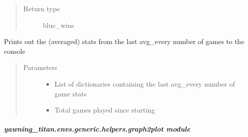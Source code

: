 \documentclass[letterpaper,10pt,english]{sphinxmanual}
\begin{document}
\begin{fulllineitems}
\begin{fulllineitems}
\begin{quote}
\begin{description}
\item[{Return type}] \leavevmode
\sphinxAtStartPar
blue\_wins

\end{description}\end{quote}

\end{fulllineitems}


\begin{fulllineitems}
\label{\detokenize{source/yawning_titan.envs.generic.helpers:yawning_titan.envs.generic.helpers.eval_printout.EvalPrintout.print_stats}}
\sphinxAtStartPar
Prints out the (averaged) stats from the last avg\_every number of games to the console
\begin{quote}\begin{description}
\item[{Parameters}] \leavevmode\begin{itemize}
\item {}
\sphinxAtStartPar
{} \textendash{} List of dictionaries containing the last avg\_every number of game stats

\item {}
\sphinxAtStartPar
{} \textendash{} Total games played since starting

\end{itemize}

\end{description}\end{quote}

\end{fulllineitems}


\end{fulllineitems}



\subparagraph{yawning\_titan.envs.generic.helpers.graph2plot module}
\label{\detokenize{source/yawning_titan.envs.generic.helpers:module-yawning_titan.envs.generic.helpers.graph2plot}}\label{\detokenize{source/yawning_titan.envs.generic.helpers:yawning-titan-envs-generic-helpers-graph2plot-module}}
\end{document}
